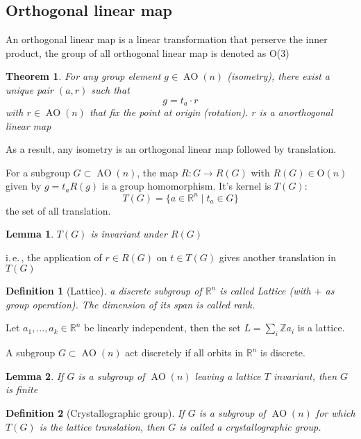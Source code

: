 \documentclass{amsart}
\newtheorem{definition}{Definition}
\newtheorem{theorem}{Theorem}
\newtheorem{lemma}{Lemma}
\DeclareMathOperator{\AO}{AO}
\begin{document}
\subsection*{Orthogonal linear map}
An orthogonal linear map is a linear transformation that perserve the inner product, the group of all
orthogonal linear map is denoted as O($3$)

\begin{theorem}
    For any group element $g\in \AO(n)$ (isometry), there exist a unique pair $(a,r)$ such that 
    \[g = t_a \cdot r\]
    with $r\in \AO(n)$ that fix the point at origin (rotation). $r$ is a anorthogonal linear map
\end{theorem}
As a result, any isometry is an orthogonal linear map followed by translation.

\vspace{10pt} %

For a subgroup $G\subset \AO(n)$, the map $R\colon G \to R(G)$ with $R(G)\in \text{O}(n)$ given by
$g = t_a R(g)$ is a group homomorphism. It's kernel is $T(G)$:
\begin{equation}
    T(G) = \{ a \in \mathbb{R}^n \mid t_a \in G\}
\end{equation}
the set of all translation. 

\begin{lemma}
    $T(G)$ is invariant under $R(G)$
\end{lemma}
i.\,e.\,, the application of $r\in R(G)$ on $t\in T(G)$ gives another translation in $T(G)$

\vspace{10pt} %

\begin{definition}
    [Lattice]
    a discrete subgroup of $\mathbb{R}^n$ is called Lattice (with $+$ as group operation). The dimension of its span is called rank.
\end{definition}
Let $a_1,\dots,a_k \in \mathbb{R}^n$ be linearly independent, then the set 
$L = \sum_i \mathbb{Z} a_i$ is a lattice.

A subgroup $G\subset \AO(n)$ act discretely if all orbits in $\mathbb{R}^n$ is discrete.

\begin{lemma}
    If $G$ is a subgroup of $\AO(n)$ leaving a lattice $T$ invariant, then $G$ is finite
\end{lemma}

\begin{definition}
    [Crystallographic group]
    If $G$ is a subgroup of $\AO(n)$ for which $T(G)$ is the lattice translation, then $G$ is called 
    a crystallographic group.
\end{definition}
\end{document}
